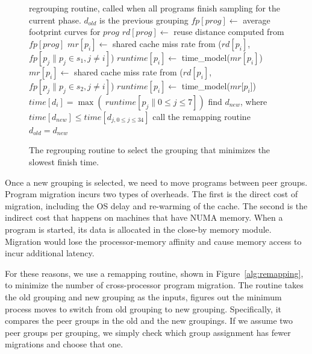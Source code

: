 \medskip
\begin{figure}[h!]
 \centering
 \small
 \begin{minipage}{\linewidth}
   \begin{algorithmic}[1]
     \REQUIRE regrouping routine, called when all
       programs finish sampling for the current phase.
     \STATE $d_{old}$ is the previous grouping
        \STATE $fp[prog] \gets$ average footprint curves for $prog$
        \STATE $rd[prog] \gets$ reuse distance computed from $fp[prog]$
     \ENDFOR
           \STATE $mr[p_i] \gets$ shared cache miss rate from 
           \STATE \indent \indent ($rd[p_i]$, $fp[p_{j}\|p_{j} \in s_1, j \ne i]$)
           \STATE $runtime[p_i] \gets$ time\_model($mr[p_i]$)
        \ENDFOR
           \STATE $mr[p_i] \gets$ shared cache miss rate from 
           \STATE \indent \indent ($rd[p_i]$, $fp[p_{j}\|p_{j} \in s_2, j \ne i]$)
           \STATE $runtime[p_i] \gets$ time\_model($mr$[$p_i$])
        \ENDFOR
        \STATE $time[d_i] = \max(\ runtime[p_j\| 0 \le j \le 7])$
     \ENDFOR
     \STATE find $d_{new}$, where $time[d_{new}] \le time[d_{j, 0\le j \le 34}]$
     \STATE call the remapping routine
     \STATE $d_{old} = d_{new}$
   \end{algorithmic}
   \caption{The regrouping routine to select the grouping that
     minimizes the slowest finish time.}
   \label{alg:feet}
 \end{minipage}
\end{figure}

Once a new grouping is selected, we need to move programs between
peer groups.  Program migration incurs two types of overheads.  The
first is the direct cost of migration, including the OS delay and
re-warming of the cache.  The second is the indirect cost that happens on
machines that have NUMA memory.  When a program is started, its
data is allocated in the close-by memory module.  Migration would lose
the processor-memory affinity and cause memory access to incur additional
latency.

For these reasons, we use a remapping routine, shown in
Figure~\ref{alg:remapping}, to minimize the number of cross-processor
program migration. The routine takes the old grouping and new
grouping as the inputs, figures out the minimum process moves to
switch from old grouping to new grouping. Specifically, it compares
the peer groups in the old and the new groupings.  If we assume two
peer groups per grouping, we simply check which group assignment has
fewer migrations and choose that one. 


